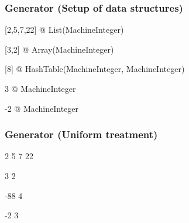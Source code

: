 \begin{frame}[fragile]
  \frametitle<presentation>{Generator (Setup of data structures)}

\begin{myverbatim}
[2,5,7,22] @ List(MachineInteger)

[3,2] @ Array(MachineInteger)

[8] @ HashTable(MachineInteger, MachineInteger)

3 @ MachineInteger

-2 @ MachineInteger
\end{myverbatim}
\end{frame}






\begin{frame}[fragile]
  \frametitle<presentation>{Generator (Uniform treatment)}

\begin{myverbatim}
2 5 7 22

3 2

-88 4

-2 3
\end{myverbatim}
\end{frame}
\begin{comment}
<<Generator>>=
aldor -gloop
macro I == MachineInteger;
import from I;
l: List I  := [2,5,7,22];
a: Array I := [3,2];
h: HashTable(I, I) := table();
h.4 := 3;
h.(-88) := -2;
for i in l         repeat stdout << i << space
for i in a         repeat stdout << i << space
for i in keys h    repeat stdout << i << space
for i in entries h repeat stdout << i << space
@
\end{comment}








